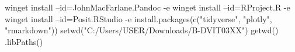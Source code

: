 winget install --id=JohnMacFarlane.Pandoc -e
winget install --id=RProject.R -e
winget install --id=Posit.RStudio -e
install.packages(c("tidyverse", "plotly", "rmarkdown"))
setwd("C:/Users/USER/Downloads/B-DVIT03XX")
getwd()
.libPaths()